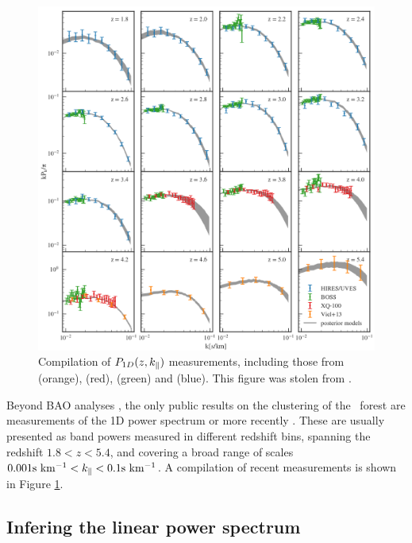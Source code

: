 \begin{figure}[h]
 \begin{center}
  \includegraphics[scale=0.4]{Figures/Walther2018_P1D}
 \end{center}
 \caption{Compilation of $P_{1D}(z,k_\parallel)$ measurements, including those from
  \cite{Viel2013} (orange), \cite{Irsic2017} (red), 
  \cite{Palanque-Delabrouille2013} (green) and \cite{Walther2018} (blue). 
  This figure was stolen from \cite{Walther2018}.
 }
 \label{fig:dataP1D}
\end{figure}

Beyond BAO analyses \cite{Bautista2017,duMasdesBourboux2017}, the only 
public results on the clustering of the \lya\ forest are measurements of 
the 1D power spectrum \cite{Croft1998,McDonald2000,McDonald2006} or 
more recently \cite{Viel2013,Palanque-Delabrouille2013,Irsic2017,Walther2018}.
These are usually presented as band powers measured in different redshift
bins, spanning the redshift $1.8 < z < 5.4$, and covering a broad range of 
scales $0.001 {\rm s~km^{-1}} < k_\parallel < 0.1 {\rm s~km^{-1}}$. 
A compilation of recent measurements is shown in Figure \ref{fig:dataP1D}.


\subsection{Infering the linear power spectrum}

